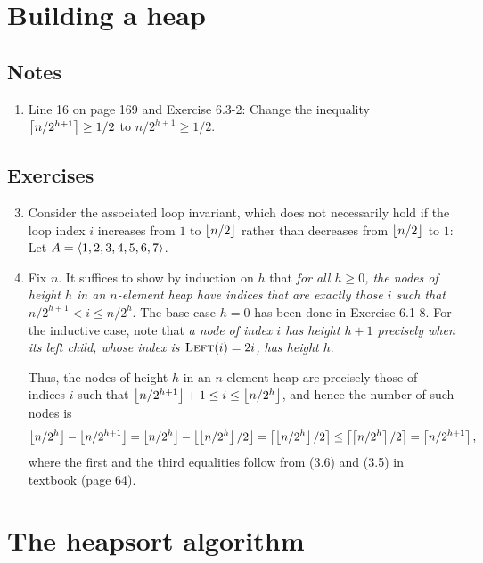 \section{Building a heap}
\subsection*{Notes}
\begin{enumerate}[1.]
%
\item Line 16 on page 169 and Exercise 6.3-2: Change the inequality $\left\lceil n/2^{h + 1}\right\rceil \geq 1/2$ to $n/2^{h + 1} \geq 1/2$.
%
\end{enumerate}

\subsection*{Exercises}
\begin{enumerate}[\thesection-1]
%
\setcounter{enumi}{2}
%
\item Consider the associated loop invariant, which does not necessarily hold if the loop index $i$ increases from $1$ to $\left\lfloor n/2\right\rfloor$ rather than decreases from $\left\lfloor n/2\right\rfloor$ to $1$: Let $A = \left\langle1, 2, 3, 4, 5, 6, 7\right\rangle$.
%
\item Fix $n$. It suffices to show by induction on $h$ that \emph{for all $h \geq 0$, the nodes of height $h$ in an $n$-element heap have indices that are exactly those $i$ such that $n/2^{h + 1} < i \leq n/2^h$}. The base case $h = 0$ has been done in Exercise 6.1-8. For the inductive case, note that \emph{a node of index $i$ has height $h + 1$ precisely when its left child, whose index is $\textnormal{\scshape Left}(i) = 2i$, has height $h$}.

Thus, the nodes of height $h$ in an $n$-element heap are precisely those of indices $i$ such that $\left\lfloor n/2^{h + 1}\right\rfloor + 1 \leq i \leq \left\lfloor n/2^h\right\rfloor$, and hence the number of such nodes is
\[
\left\lfloor n/2^h\right\rfloor - \left\lfloor n/2^{h + 1}\right\rfloor = \left\lfloor n/2^h\right\rfloor - \left\lfloor\left\lfloor n/2^h\right\rfloor / 2\right\rfloor = \left\lceil\left\lfloor n/2^h\right\rfloor / 2\right\rceil \leq \left\lceil\left\lceil n/2^h\right\rceil / 2\right\rceil = \left\lceil n/2^{h + 1}\right\rceil,
\]
where the first and the third equalities follow from (3.6) and (3.5) in textbook (page 64).
%
\end{enumerate}


\section{The heapsort algorithm}
